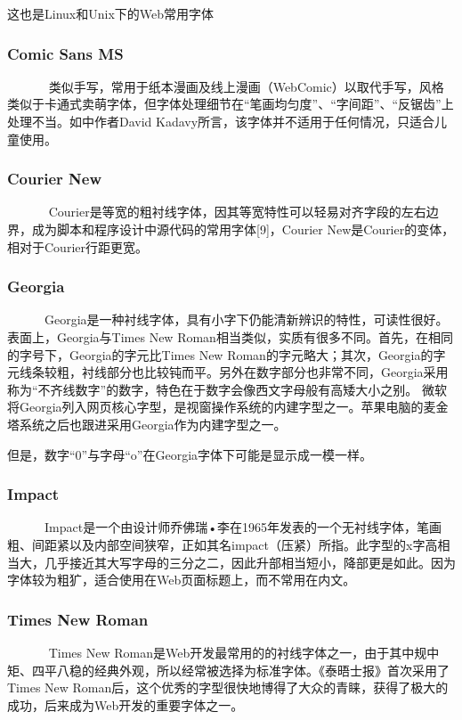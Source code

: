 \documentclass[a4paper]{article}
\begin{document}
这也是Linux和Unix下的Web常用字体
	\subsubsection{Comic Sans MS} 
	
~~~~~~   类似手写，常用于纸本漫画及线上漫画（WebComic）以取代手写，风格类似于卡通式卖萌字体，但字体处理细节在“笔画均匀度”、“字间距”、“反锯齿”上处理不当。如\cite{cyt3}中作者David Kadavy所言，该字体并不适用于任何情况，只适合儿童使用。
	\subsubsection{Courier New} 
	
~~~~~~    Courier是等宽的粗衬线字体，因其等宽特性可以轻易对齐字段的左右边界，成为脚本和程序设计中源代码的常用字体[9]，Courier New是Courier的变体，相对于Courier行距更宽。
	\subsubsection{Georgia} 
	
~~~~~~Georgia是一种衬线字体，具有小字下仍能清新辨识的特性，可读性很好。表面上，Georgia与Times New Roman相当类似，实质有很多不同。首先，在相同的字号下，Georgia的字元比Times New Roman的字元略大；其次，Georgia的字元线条较粗，衬线部分也比较钝而平。另外在数字部分也非常不同，Georgia采用称为“不齐线数字”的数字，特色在于数字会像西文字母般有高矮大小之别。
微软将Georgia列入网页核心字型，是视窗操作系统的内建字型之一。苹果电脑的麦金塔系统之后也跟进采用Georgia作为内建字型之一。
	
但是，数字“0”与字母“o”在Georgia字体下可能是显示成一模一样。
	\subsubsection{Impact} 
	
~~~~~~Impact是一个由设计师乔佛瑞•李在1965年发表的一个无衬线字体，笔画粗、间距紧以及内部空间狭窄，正如其名impact（压紧）所指。此字型的x字高相当大，几乎接近其大写字母的三分之二，因此升部相当短小，降部更是如此。因为字体较为粗犷，适合使用在Web页面标题上，而不常用在内文。
	\subsubsection{Times New Roman} 
	
~~~~~~    Times New Roman是Web开发最常用的的衬线字体之一，由于其中规中矩、四平八稳的经典外观，所以经常被选择为标准字体。《泰晤士报》首次采用了Times New Roman后，这个优秀的字型很快地博得了大众的青睐，获得了极大的成功，后来成为Web开发的重要字体之一。
\end{document}
